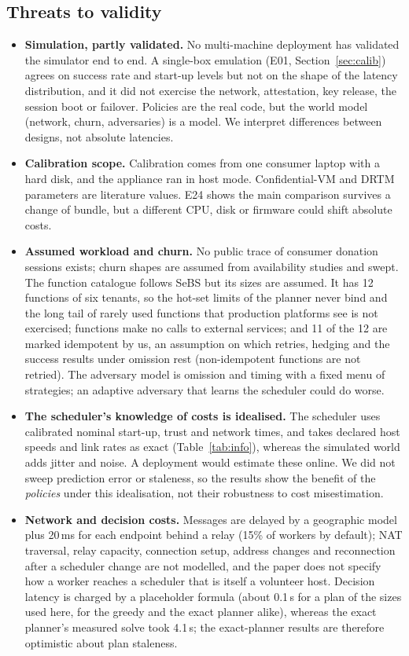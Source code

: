 \subsection{Threats to validity}
\label{sec:threats}
\begin{itemize}
\item \textbf{Simulation, partly validated.} No multi-machine deployment has validated the simulator end to end. A single-box emulation (E01, Section~\ref{sec:calib}) agrees on success rate and start-up levels but not on the shape of the latency distribution, and it did not exercise the network, attestation, key release, the session boot or failover. Policies are the real code, but the world model (network, churn, adversaries) is a model. We interpret differences between designs, not absolute latencies.
\item \textbf{Calibration scope.} Calibration comes from one consumer laptop with a hard disk, and the appliance ran in host mode. Confidential-VM and DRTM parameters are literature values. E24 shows the main comparison survives a change of bundle, but a different CPU, disk or firmware could shift absolute costs.
\item \textbf{Assumed workload and churn.} No public trace of consumer donation sessions exists; churn shapes are assumed from availability studies and swept. The function catalogue follows SeBS but its sizes are assumed. It has 12 functions of six tenants, so the hot-set limits of the planner never bind and the long tail of rarely used functions that production platforms see is not exercised; functions make no calls to external services; and 11 of the 12 are marked idempotent by us, an assumption on which retries, hedging and the success results under omission rest (non-idempotent functions are not retried). The adversary model is omission and timing with a fixed menu of strategies; an adaptive adversary that learns the scheduler could do worse.
\item \textbf{The scheduler's knowledge of costs is idealised.} The scheduler uses calibrated nominal start-up, trust and network times, and takes declared host speeds and link rates as exact (Table~\ref{tab:info}), whereas the simulated world adds jitter and noise. A deployment would estimate these online. We did not sweep prediction error or staleness, so the results show the benefit of the \emph{policies} under this idealisation, not their robustness to cost misestimation.
\item \textbf{Network and decision costs.} Messages are delayed by a geographic model plus 20\,ms for each endpoint behind a relay (15\% of workers by default); NAT traversal, relay capacity, connection setup, address changes and reconnection after a scheduler change are not modelled, and the paper does not specify how a worker reaches a scheduler that is itself a volunteer host. Decision latency is charged by a placeholder formula (about 0.1\,s for a plan of the sizes used here, for the greedy and the exact planner alike), whereas the exact planner's measured solve took 4.1\,s; the exact-planner results are therefore optimistic about plan staleness.

\end{itemize}
